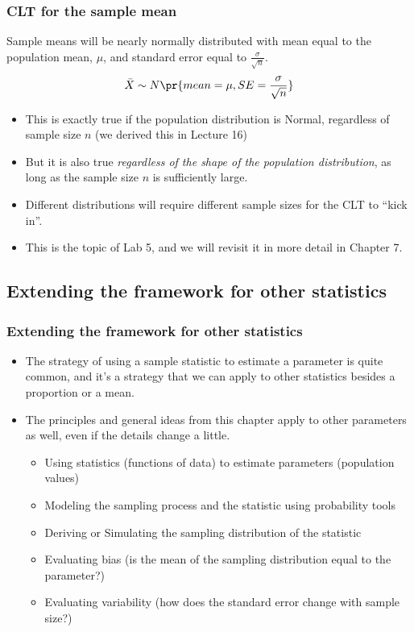 \documentclass[t,compress,mathserif]{beamer}
\begin{document}
\begin{frame}
\frametitle{CLT for the sample mean}

{Sample means will be nearly normally distributed with mean equal to the population mean, $\mu$, and standard error equal to $\frac{\sigma}{\sqrt{n}}$.
\[ \bar{X} \sim N \pr{ mean = \mu, SE = \frac{\sigma}{\sqrt{n}} } \]
}

\begin{itemize}
    \item This is exactly true if the population distribution is Normal, regardless of sample size $n$ (we derived this in Lecture 16)
    \item But it is also true \emph{regardless of the shape of the population distribution}, as long as the sample size $n$ is sufficiently large.
    \item Different distributions will require different sample sizes for the CLT to ``kick in''.
    \item This is the topic of Lab 5, and we will revisit it in more detail in Chapter 7.
\end{itemize}

\end{frame}


\subsection{Extending the framework for other statistics}


\begin{frame}
\frametitle{Extending the framework for other statistics}

\begin{itemize}

\item The strategy of using a sample statistic to estimate a parameter is quite common, and it's a strategy that we can apply to other statistics besides a proportion or a mean.

\item The principles and general ideas from this chapter apply to other parameters as well, even if the details change a little. 
\begin{itemize}
    \item Using statistics (functions of data) to estimate parameters (population values)
    \item Modeling the sampling process and the statistic using probability tools
    \item Deriving or Simulating the sampling distribution of the statistic
    \item Evaluating bias (is the mean of the sampling distribution equal to the parameter?)
    \item Evaluating variability (how does the standard error change with sample size?)
\end{itemize}
\end{itemize}
\end{frame}
\end{document}
